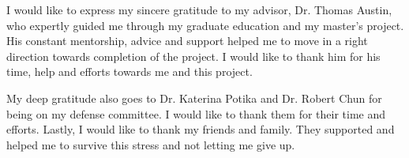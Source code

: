 I would like to express my sincere gratitude to my advisor, Dr. Thomas Austin,
who expertly guided me through my graduate education and my master’s project.
His constant mentorship, advice and support helped me to move in a
right direction towards completion of the project. I would like to thank him for his time, help and efforts towards me and this project.

My deep gratitude also goes to Dr.  Katerina Potika and Dr. Robert Chun for
being on my defense committee. I would like to thank them for their time and efforts.
Lastly, I would like to thank my friends and family. They supported and helped me
to survive this stress and not letting me give up.
